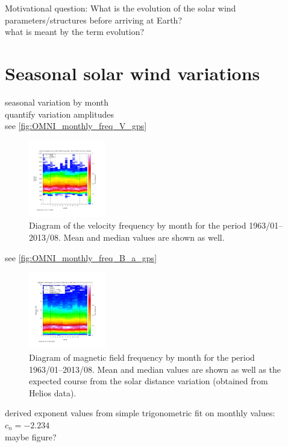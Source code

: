 Motivational question: What is the evolution of the solar wind parameters/structures before arriving at Earth?\\
what is meant by the term evolution?\\


\section{Seasonal solar wind variations}
seasonal variation by month\\
quantify variation amplitudes\\

see \autoref{fig:OMNI_monthly_freq_V_gps}
\begin{figure}[htb]
	\centering
	\includegraphics[width=0.3\textwidth]{images/gnuplots/OMNI_monthly_freq_V_gps.png}
	\caption{Diagram of the velocity frequency by month for the period 1963/01--2013/08. Mean and median values are shown as well.}
	\label{fig:OMNI_monthly_freq_V_gps}
\end{figure}

see \autoref{fig:OMNI_monthly_freq_B_a_gps}
\begin{figure}[htb]
	\centering
	\includegraphics[width=0.3\textwidth]{images/gnuplots/OMNI_monthly_freq_B_a_gps.png}
	\caption{Diagram of magnetic field frequency by month for the period 1963/01--2013/08. Mean and median values are shown as well as the expected course from the solar distance variation (obtained from Helios data).}
	\label{fig:OMNI_monthly_freq_B_a_gps}
\end{figure}

derived exponent values from simple trigonometric fit on monthly values:\\
$c_n = -2.234$\\
maybe figure?\\


